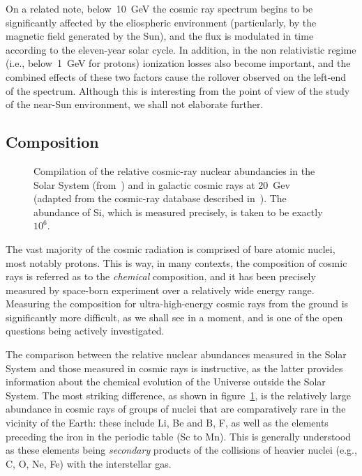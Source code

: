 On a related note, below~10~GeV the cosmic ray spectrum begins to be significantly
affected by the eliospheric environment (particularly, by the magnetic field generated
by the Sun), and the flux is modulated in time according to the eleven-year solar
cycle. In addition, in the non relativistic regime (i.e., below~1~GeV for protons)
ionization losses also become important, and the combined effects of these two
factors cause the rollover observed on the left-end of the spectrum. Although this
is interesting from the point of view of the study of the near-Sun environment,
we shall not elaborate further.


\subsection{Composition}

\begin{figure}[!htbp]
  
  \caption{Compilation of the relative cosmic-ray nuclear abundancies in the Solar System
    (from~\cite{2003ApJ...591.1220L}) and in galactic cosmic rays at 20~Gev (adapted from
    the cosmic-ray database described in~\cite{2023EPJC...83..971}). The abundance
    of Si, which is measured precisely, is taken to be exactly $10^6$.}
  \label{fig:cr_composition}
\end{figure}

The vast majority of the cosmic radiation is comprised of bare atomic nuclei,
most notably protons. This is way, in many contexts, the composition of cosmic
rays is referred as to the \emph{chemical} composition, and it has been precisely
measured by space-born experiment over a relatively wide energy
range. Measuring the composition for ultra-high-energy cosmic rays from the ground
is significantly more difficult, as we shall see in a moment, and is one of the open
questions being actively investigated.

The comparison between the relative nuclear abundances measured in the Solar
System and
those measured in cosmic rays is instructive, as the latter provides information
about the chemical evolution of the Universe outside the Solar System.
The most striking difference, as shown in figure~\ref{fig:cr_composition}, is the
relatively large abundance in cosmic rays of groups of nuclei that are comparatively
rare in the vicinity of the Earth: these include Li, Be and B, F, as well as the
elements preceding the iron in the periodic table (Sc to Mn). This is generally
understood as these elements being \emph{secondary} products of the collisions of
heavier nuclei (e.g., C, O, Ne, Fe) with the interstellar gas.

